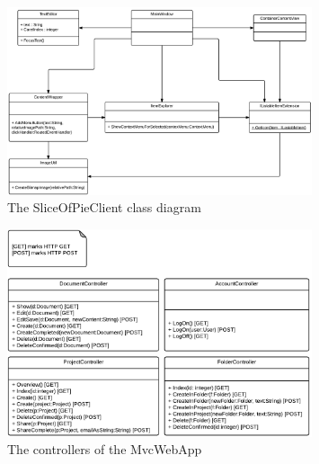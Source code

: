 \begin{figure}[htb]
    \centering
    \includegraphics[width=0.8\textwidth]{Software_design/graphics/MainWindow.png}
    \caption{The SliceOfPieClient class diagram}
    \label{fig:mainwindow-diagram}
\end{figure}

\begin{figure}[hbt]
    \centering
    \includegraphics[width=0.8\textwidth]{Software_design/graphics/MvcWebApp.png}
    \caption{The controllers of the MvcWebApp}
    \label{fig:mvcwebapp-diagram}
\end{figure}
